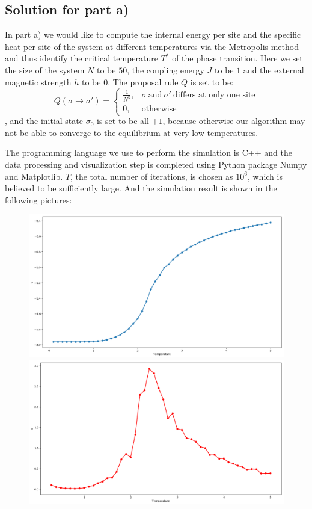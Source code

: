 \documentclass[a4paper]{article}
\begin{document}
\subsection{Solution for part a)}
In part a) we would like to compute the internal energy per site and the specific heat per site of the system at different temperatures via the Metropolis method and thus identify the critical temperature $T^*$ of the phase transition. Here we set the size of the system $N$ to be $50$, the coupling energy $J$ to be $1$ and the external magnetic strength $h$ to be $0$. The proposal rule $Q$ is set to be:
\begin{displaymath}
Q(\sigma \to \sigma')=\begin{cases}
\frac{1}{N^2}, &\sigma\ \text{and}\ \sigma'\ \text{differs at only one site}\\
0, &\text{otherwise}
\end{cases}
\end{displaymath}
, and the initial state $\sigma_0$ is set to be all $+1$, because otherwise our algorithm may not be able to converge to the equilibrium at very low temperatures.

The programming language we use to perform the simulation is C++ and the data processing and visualization step is completed using Python package Numpy and Matplotlib. $T$, the total number of iterations, is chosen as $10^6$, which is believed to be sufficiently large. And the simulation result is shown in the following pictures:

\begin{figure}[ht]
\centering
\includegraphics[scale=0.325]{u.png}
\includegraphics[scale=0.325]{c.png}
\end{figure}
\end{document}
